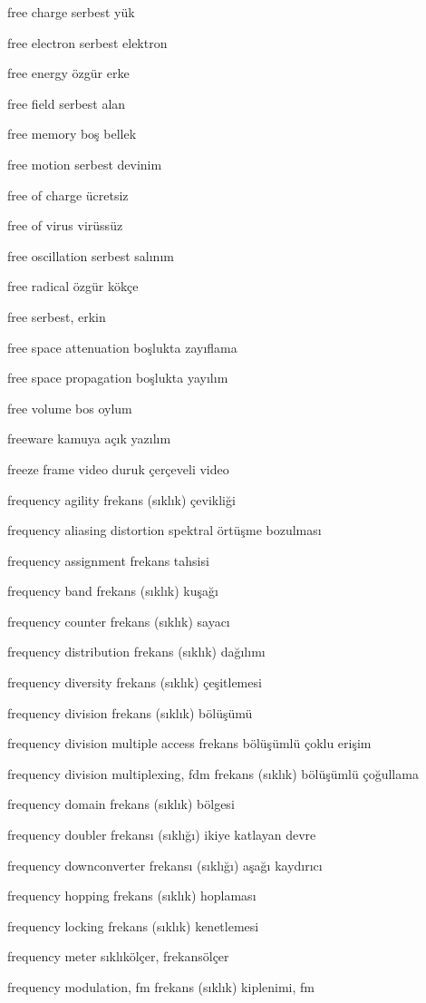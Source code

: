 \documentclass[12pt,fleqn]{article}\usepackage{../../common}
\begin{document}
free charge serbest yük

free electron serbest elektron

free energy özgür erke

free field serbest alan

free memory boş bellek

free motion serbest devinim

free of charge ücretsiz

free of virus virüssüz

free oscillation serbest salınım

free radical özgür kökçe

free serbest, erkin

free space attenuation boşlukta zayıflama

free space propagation boşlukta yayılım

free volume bos oylum

freeware kamuya açık yazılım

freeze frame video duruk çerçeveli video

frequency agility frekans (sıklık) çevikliği

frequency aliasing distortion spektral örtüşme bozulması

frequency assignment frekans tahsisi

frequency band frekans (sıklık) kuşağı

frequency counter frekans (sıklık) sayacı

frequency distribution frekans (sıklık) dağılımı

frequency diversity frekans (sıklık) çeşitlemesi

frequency division frekans (sıklık) bölüşümü

frequency division multiple access frekans bölüşümlü çoklu erişim

frequency division multiplexing, fdm frekans (sıklık) bölüşümlü çoğullama

frequency domain frekans (sıklık) bölgesi

frequency doubler frekansı (sıklığı) ikiye katlayan devre

frequency downconverter frekansı (sıklığı) aşağı kaydırıcı

frequency hopping frekans (sıklık) hoplaması

frequency locking frekans (sıklık) kenetlemesi

frequency meter sıklıkölçer, frekansölçer

frequency modulation, fm frekans (sıklık) kiplenimi, fm
\end{document}
